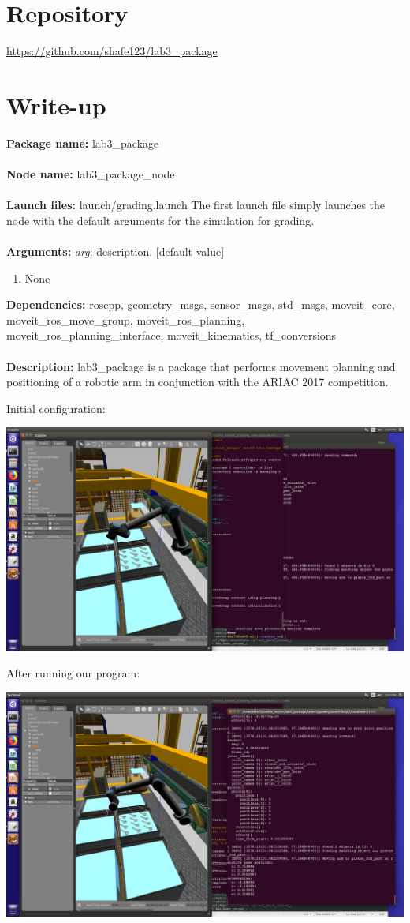 \documentclass[12pt,letterpaper]{article}
\newcommand\packagename{lab3\_package}
\begin{document}
\section*{Repository}
\url{https://github.com/shafe123/lab3_package}

\section*{Write-up}

\textbf{Package name:} \packagename \\\\
\textbf{Node name:} \packagename\_node \\\\
\textbf{Launch files:}  launch/grading.launch
The first launch file simply launches the node with the default arguments for the simulation for grading. \\\\
\textbf{Arguments:}  \emph{arg}: description. [default value]
\begin{enumerate}
    \item None
\end{enumerate}
\textbf{Dependencies:}  roscpp, geometry\_msgs, sensor\_msgs, std\_msgs, moveit\_core, moveit\_ros\_move\_group, moveit\_ros\_planning, moveit\_ros\_planning\_interface, moveit\_kinematics, tf\_conversions \\\\
\textbf{Description:}  \packagename \hspace{1pt} is a package that performs movement planning and positioning of a robotic arm in conjunction with the ARIAC 2017 competition.

\newpage
Initial configuration:
\begin{center}
    \includegraphics[scale=0.3,angle=270]{HW3_images/initial_config}
\end{center}{}
\newpage
After running our program:
\begin{center}
    \includegraphics[scale=0.3,angle=270]{HW3_images/after_config}
\end{center}{}
\end{document}
